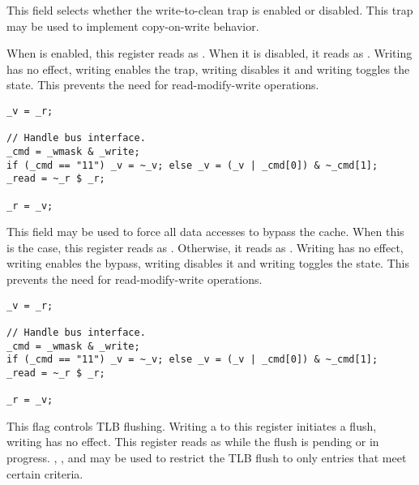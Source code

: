 This field selects whether the write-to-clean trap is enabled or disabled. This
trap may be used to implement copy-on-write behavior.

When  is enabled, this register reads as . 
When it is disabled, it reads as . Writing  has no effect, 
writing  enables the trap, writing  disables it and writing 
 toggles the state. This prevents the need for read-modify-write 
operations.

\declaration{}
\implementation{}
\begin{lstlisting}
_v = _r;

// Handle bus interface.
_cmd = _wmask & _write;
if (_cmd == "11") _v = ~_v; else _v = (_v | _cmd[0]) & ~_cmd[1];
_read = ~_r $ _r;

_r = _v;
\end{lstlisting}

This field may be used to force all data accesses to bypass the cache. When this 
is the case, this register reads as . Otherwise, it reads as . 
Writing  has no effect, writing  enables the bypass, writing 
 disables it and writing  toggles the state. This prevents the 
need for read-modify-write operations.

\declaration{}
\implementation{}
\begin{lstlisting}
_v = _r;

// Handle bus interface.
_cmd = _wmask & _write;
if (_cmd == "11") _v = ~_v; else _v = (_v | _cmd[0]) & ~_cmd[1];
_read = ~_r $ _r;

_r = _v;
\end{lstlisting}

This flag controls TLB flushing. Writing a  to this register initiates a
flush, writing  has no effect. This register reads as  while the
flush is pending or in progress. , , and  may
be used to restrict the TLB flush to only entries that meet certain criteria.

